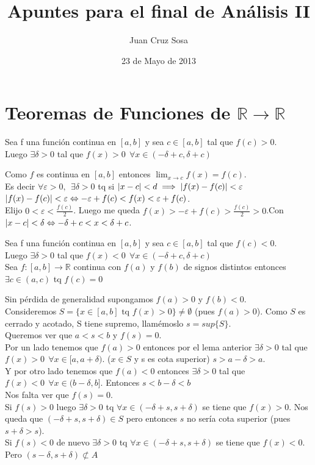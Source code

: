 \documentclass[a4paper,10pt]{article}
\title{ Apuntes para el final de Análisis II }
\author{Juan Cruz Sosa}
\date{23 de Mayo de 2013}
\begin{document}
\maketitle
\tableofcontents 
\clearpage

\section{Teoremas de Funciones de $\mathbb{R} \longrightarrow \mathbb{R}$}
\lema Sea f una función continua en $[a,b]$ y sea $c\in[a,b]$ tal que $f(c)>0$. \\ Luego $\exists \delta > 0$ tal que $f(x)>0 \ \  \forall x \in (-\delta+c,\delta+c)$
\begin{demo}
Como $f$ es continua en $[a,b]$ entonces $\displaystyle\lim_{x \rightarrow c} f(x) = f(c)$. \\
Es decir $\forall \varepsilon > 0, \ \ \exists \delta > 0$ tq si $\left\lvert x-c\right\rvert<d \implies \left\lvert f(x)-f(c)\right\rvert < \varepsilon$ \\
$\left\lvert f(x)-f(c)\right\rvert < \varepsilon \Leftrightarrow -\varepsilon + f(c) < f(x) < \varepsilon + f(c)$.\\
Elijo $0 < \varepsilon < \frac{f(c)}{2}$. Luego me queda $f(x) > -\varepsilon + f(c) > \frac{f(c)}{2} > 0$.Con $\left\lvert x-c\right\rvert < \delta \Leftrightarrow -\delta + c < x < \delta + c$. 
\end{demo}
\corolario Sea f una función continua en $[a,b]$ y sea $c\in[a,b]$ tal que $f(c)<0$. \\ Luego $\exists \delta > 0$ tal que $f(x)<0 \ \  \forall x \in (-\delta+c,\delta+c)$
\\
 Sea $f:[a,b] \rightarrow \mathbb{R}$ continua con $f(a)$ y $f(b)$ de signos distintos entonces $\exists c \in (a,c)$ tq $f(c)=0$
\begin{demo}
Sin pérdida de generalidad supongamos $f(a)>0$ y $f(b)<0$.\\
Consideremos $S=\lbrace x\in[a,b] \mbox{ tq } f(x) > 0 \rbrace \neq \emptyset$ (pues $f(a) > 0$). Como $S$ es cerrado y acotado, S tiene supremo, llamémoslo $s=sup\lbrace S\rbrace$. \\
Queremos ver que $a < s < b$ y $f(s) = 0$.\\
Por un lado tenemos que $f(a)>0$ entonces por el lema anterior $\exists \delta > 0$ tal que $f(x)>0 \ \ \forall x \in [a,a+\delta)$. ($x \in S$ y s es cota superior) $s > a - \delta > a$. \\
Y por otro lado tenemos que $f(a)<0$ entonces $\exists \delta > 0$ tal que $f(x)<0 \ \ \forall x \in (b-\delta,b]$. Entonces $s < b - \delta < b$ \\
Nos falta ver que $f(s)=0$. \\
Si $f(s)>0$ luego $\exists \delta > 0$ tq $\forall x \in (-\delta+s,s+\delta)$ se tiene que $f(x) > 0$. Nos queda que $(-\delta+s,s+\delta) \in S$ pero entonces $s$ no sería cota superior (pues $s+\delta>s$).\\
Si $f(s)<0$ de nuevo $\exists \delta > 0$ tq $\forall x \in (-\delta+s,s+\delta)$ se tiene que $f(x) < 0$. Pero $(s-\delta,s+\delta) \not \subset A$ 
\end{demo}
\end{document}
